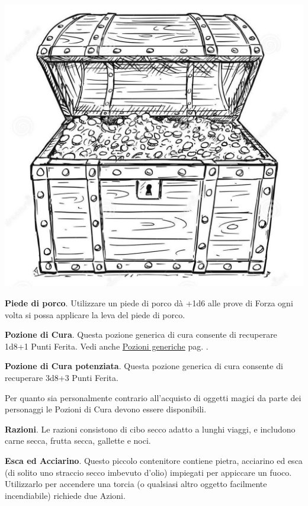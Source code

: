 \begin{multicols}{2}
\begin{center}
	\includegraphics[width=0.7\linewidth]{immagini/forziere.png}
\end{center}

\textbf{Piede di porco}. Utilizzare un piede di porco dà +1d6 alle prove di Forza ogni volta si possa applicare la leva del piede di porco.\hypertarget{piedediporco}{}\label{piedediporco}

\textbf{Pozione di Cura}\hypertarget{Equip Pozione di Cura}{}. Questa pozione generica di cura consente di recuperare 1d8+1 Punti Ferita. Vedi anche \hyperlink{pozionigeneriche}{Pozioni generiche} pag. \pageref{pozionigeneriche}.

\textbf{Pozione di Cura potenziata}\label{Pozione di Cura potenziata}\hypertarget{Equip Pozione di Cura potenziata}{}. Questa pozione generica di cura consente di recuperare 3d8+3 Punti Ferita.

\begin{changemargin}{0.3cm}{0.3cm}\begin{narratore}
Per quanto sia personalmente contrario all'acquisto di oggetti magici da parte dei personaggi le Pozioni di Cura devono essere disponibili.
\end{narratore}\end{changemargin}

\textbf{Razioni}\hypertarget{Razioni}{}\label{Razioni}. Le razioni consistono di cibo secco adatto a lunghi viaggi, e includono carne secca, frutta secca, gallette e noci.

\textbf{Esca ed Acciarino}\label{Esca ed Acciarino}\hypertarget{Esca ed Acciarino}{}. Questo piccolo contenitore contiene pietra, acciarino ed esca (di solito uno straccio secco imbevuto d'olio) impiegati per appiccare un fuoco. Utilizzarlo per accendere una torcia (o qualsiasi altro oggetto facilmente incendiabile) richiede due Azioni.


\end{multicols}
